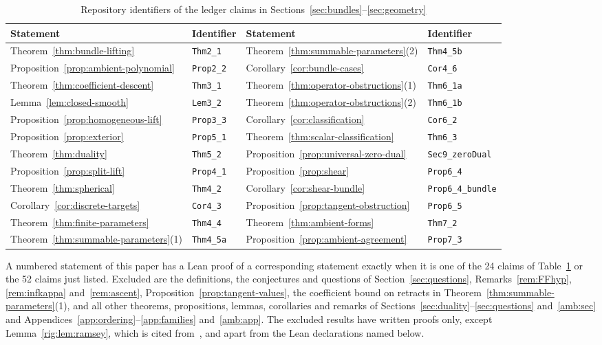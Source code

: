 \begin{table}[htbp]
\centering
\small
\caption{Repository identifiers of the ledger claims in Sections~\ref{sec:bundles}--\ref{sec:geometry}}\label{ver:tab:ids}
\begin{tabular}{ll@{\qquad}ll}
\hline
Statement & Identifier & Statement & Identifier\\
\hline
Theorem~\ref{thm:bundle-lifting} & \texttt{Thm2\_1} & Theorem~\ref{thm:summable-parameters}(2) & \texttt{Thm4\_5b}\\
Proposition~\ref{prop:ambient-polynomial} & \texttt{Prop2\_2} & Corollary~\ref{cor:bundle-cases} & \texttt{Cor4\_6}\\
Theorem~\ref{thm:coefficient-descent} & \texttt{Thm3\_1} & Theorem~\ref{thm:operator-obstructions}(1) & \texttt{Thm6\_1a}\\
Lemma~\ref{lem:closed-smooth} & \texttt{Lem3\_2} & Theorem~\ref{thm:operator-obstructions}(2) & \texttt{Thm6\_1b}\\
Proposition~\ref{prop:homogeneous-lift} & \texttt{Prop3\_3} & Corollary~\ref{cor:classification} & \texttt{Cor6\_2}\\
Proposition~\ref{prop:exterior} & \texttt{Prop5\_1} & Theorem~\ref{thm:scalar-classification} & \texttt{Thm6\_3}\\
Theorem~\ref{thm:duality} & \texttt{Thm5\_2} & Proposition~\ref{prop:universal-zero-dual} & \texttt{Sec9\_zeroDual}\\
Proposition~\ref{prop:split-lift} & \texttt{Prop4\_1} & Proposition~\ref{prop:shear} & \texttt{Prop6\_4}\\
Theorem~\ref{thm:spherical} & \texttt{Thm4\_2} & Corollary~\ref{cor:shear-bundle} & \texttt{Prop6\_4\_bundle}\\
Corollary~\ref{cor:discrete-targets} & \texttt{Cor4\_3} & Proposition~\ref{prop:tangent-obstruction} & \texttt{Prop6\_5}\\
Theorem~\ref{thm:finite-parameters} & \texttt{Thm4\_4} & Theorem~\ref{thm:ambient-forms} & \texttt{Thm7\_2}\\
Theorem~\ref{thm:summable-parameters}(1) & \texttt{Thm4\_5a} & Proposition~\ref{prop:ambient-agreement} & \texttt{Prop7\_3}\\
\hline
\end{tabular}
\end{table}

A numbered statement of this paper has a Lean proof of a corresponding statement exactly when it is one of the 24
claims of Table~\ref{ver:tab:ids} or the 52 claims just listed. Excluded are the definitions, the conjectures and
questions of Section~\ref{sec:questions}, Remarks~\ref{rem:FFhyp}, \ref{rem:infkappa} and~\ref{rem:ascent},
Proposition~\ref{prop:tangent-values}, the coefficient bound on retracts in Theorem~\ref{thm:summable-parameters}(1),
and all other theorems, propositions, lemmas, corollaries and remarks of
Sections~\ref{sec:duality}--\ref{sec:questions} and~\ref{amb:sec} and Appendices~\ref{app:ordering}--\ref{app:families}
and~\ref{amb:app}. The excluded
results have written proofs only, except Lemma~\ref{rig:lem:ramsey}, which is cited from~\cite{Ra}, and apart from the
Lean declarations named below.

